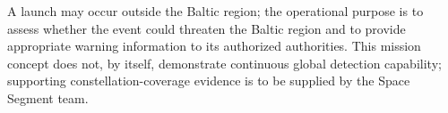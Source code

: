 A launch may occur outside the Baltic region; the operational purpose is to assess whether the event could threaten the Baltic region and to provide appropriate warning information to its authorized authorities. This mission concept does not, by itself, demonstrate continuous global detection capability; supporting constellation-coverage evidence is to be supplied by the Space Segment team.
